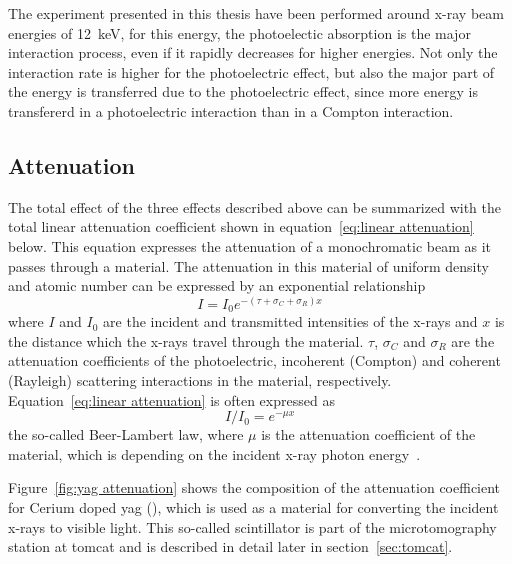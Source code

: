 The experiment presented in this thesis have been performed around x-ray beam energies of \SI{12}{\kilo\electronvolt}, for this energy, the photoelectic absorption is the major interaction process, even if it rapidly decreases for higher energies. Not only the interaction rate is higher for the photoelectric effect, but also the major part of the energy is transferred due to the photoelectric effect, since more energy is transfererd in a photoelectric interaction than in a Compton interaction.

\subsection{Attenuation}
The total effect of the three effects described above can be summarized with the total linear attenuation coefficient shown in equation~\ref{eq:linear attenuation} below. This equation expresses the attenuation of a monochromatic beam as it passes through a material. The attenuation in this material of uniform density and atomic number can be expressed by an exponential relationship%
\begin{equation}%
	I=I_{0}e^{-(\tau+\sigma_{C}+\sigma_{R})x}%
	\label{eq:linear attenuation}%
\end{equation}%
where $I$ and $I_{0}$ are the incident and transmitted intensities of the x-rays and $x$ is the distance which the x-rays travel through the material. $\tau$, $\sigma_{C}$ and $\sigma_{R}$ are the attenuation coefficients of the photoelectric, incoherent (Compton) and coherent (Rayleigh) scattering interactions in the material, respectively. Equation~\ref{eq:linear attenuation} is often expressed as
\begin{equation}
	I/I_{0}=e^{-\mu x}
	\label{eq:beer-lambert}
\end{equation}%
the so-called Beer-Lambert law, where $\mu$ is the attenuation coefficient of the material, which is depending on the incident x-ray photon energy~\cite{Hsieh2003}. 

Figure~\ref{fig:yag attenuation} shows the composition of the attenuation coefficient for Cerium doped \ac{yag} (), which is used as a material for converting the incident x-rays to visible light. This so-called scintillator is part of the microtomography station at \ac{tomcat} and is described in detail later in section~\ref{sec:tomcat}.

